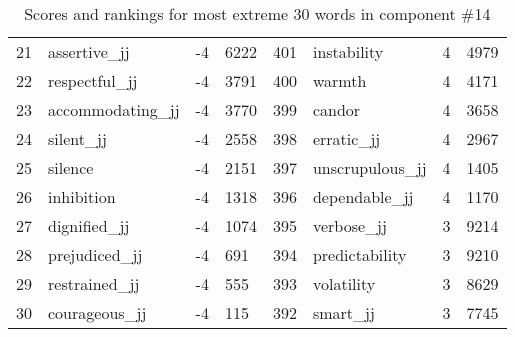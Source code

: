 \begin{table}[tbp]
\begin{tabular}{| rlr@{.}l | rlr@{.}l |}
    21 & assertive\_jj & -4 & 6222    &    401 & instability & 4 & 4979 \\
    22 & respectful\_jj & -4 & 3791    &    400 & warmth & 4 & 4171 \\
    23 & accommodating\_jj & -4 & 3770    &    399 & candor & 4 & 3658 \\
    24 & silent\_jj & -4 & 2558    &    398 & erratic\_jj & 4 & 2967 \\
    25 & silence & -4 & 2151    &    397 & unscrupulous\_jj & 4 & 1405 \\
    26 & inhibition & -4 & 1318    &    396 & dependable\_jj & 4 & 1170 \\
    27 & dignified\_jj & -4 & 1074    &    395 & verbose\_jj & 3 & 9214 \\
    28 & prejudiced\_jj & -4 & 691    &    394 & predictability & 3 & 9210 \\
    29 & restrained\_jj & -4 & 555    &    393 & volatility & 3 & 8629 \\
    30 & courageous\_jj & -4 & 115    &    392 & smart\_jj & 3 & 7745 \\
    \hline
    \end{tabular}
    \caption{Scores and rankings for most extreme 30 words in component \#14} 
\end{table}
\clearpage
